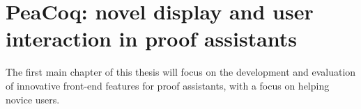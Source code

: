 \chapter{PeaCoq: novel display and user interaction in proof assistants}

The first main chapter of this thesis will focus on the development and
evaluation of innovative front-end features for proof assistants, with a focus
on helping novice users.


